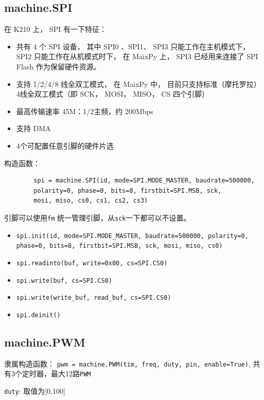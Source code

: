 \documentclass[UTF8]{ctexart}
\begin{document}
    \subsection{machine.SPI}
    在 K210 上， SPI 有一下特征：
    \begin{itemize}
        \item 共有 4 个 SPI 设备， 其中 SPI0 、SPI1、 SPI3 只能工作在主机模式下， SPI2 只能工作在从机模式时下， 在 MaixPy 上， SPI3 已经用来连接了 SPI Flash 作为保留硬件资源。
        \item 支持 1/2/4/8 线全双工模式， 在 MaixPy 中， 目前只支持标准（摩托罗拉）4线全双工模式（即 SCK， MOSI， MISO， CS 四个引脚）
        \item 最高传输速率 45M：1/2主频，约 200Mbps
        \item 支持 DMA
        \item 4个可配置任意引脚的硬件片选
    \end{itemize}
    构造函数：
    \begin{lstlisting}
        spi = machine.SPI(id, mode=SPI.MODE_MASTER, baudrate=500000, 
        polarity=0, phase=0, bits=8, firstbit=SPI.MSB, sck, 
        mosi, miso, cs0, cs1, cs2, cs3)
    \end{lstlisting}
    引脚可以使用\colorbox{mygrey}{\color{myred}\lstinline|fm|} 统一管理引脚，从\colorbox{mygrey}{\color{myred}\lstinline|sck|}一下都可以不设置。
    \begin{itemize}
        \item \colorbox{mygrey}{\color{myred}\lstinline|spi.init(id, mode=SPI.MODE_MASTER, baudrate=500000, polarity=0, phase=0, bits=8, firstbit=SPI.MSB, sck, mosi, miso, cs0)|}
        \item \colorbox{mygrey}{\color{myred}\lstinline|spi.readinto(buf, write=0x00, cs=SPI.CS0)|}  
        \item \colorbox{mygrey}{\color{myred}\lstinline|spi.write(buf, cs=SPI.CS0)|}
        \item \colorbox{mygrey}{\color{myred}\lstinline|spi.write(write_buf, read_buf, cs=SPI.CS0)|}
        \item \colorbox{mygrey}{\color{myred}\lstinline|spi.deinit()|}  
    \end{itemize}

    \subsection{machine.PWM}
    隶属构造函数： \colorbox{mygrey}{\lstinline|pwm = machine.PWM(tim, freq, duty, pin, enable=True)|}, 共有3个定时器，最大12路\colorbox{mygrey}{\color{myred}\lstinline|PWM|}
    \par \colorbox{mygrey}{\color{myred}\lstinline|duty|}: 取值为\colorbox{mygrey}{[0,100]}
\end{document}
